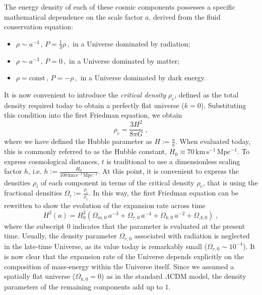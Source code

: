 \documentclass[12pt,a4paper,oneside]{report}
\begin{document}
The energy density of each of these cosmic components possesses a specific mathematical dependence on the scale factor $a$, derived from the fluid conservation equation:%
\begin{itemize}
  \item $\rho \sim a^{-4} \, , \, P = \frac{1}{3}\rho \, ,$ in a Universe dominated by radiation;
  \item $\rho \sim a^{-3} \, , \, P = 0 \, ,$ in a Universe dominated by matter;
  \item $\rho = \mathrm{const} \, , \, P = -\rho \, ,$ in a Universe dominated by dark energy.
\end{itemize}
It is now convenient to introduce the \textit{critical density} $\rho_\mathrm{c}$, defined as the total density required today to obtain a perfectly flat universe ($k = 0$). Substituting this condition into the first Friedman equation, we obtain
\begin{equation}
  \rho_\mathrm{c} = \frac{3H^2}{8 \pi G} \; ,
  \label{eq:rho_crit}
\end{equation}
where we have defined the Hubble parameter as $H := \frac{\dot{a}}{a}$. When evaluated today, this is commonly referred to as the Hubble constant, $H_0 \approx 70 \, \mathrm{km \, s^{-1} \, Mpc^{-1}}$. To express cosmological distances, $t$ is traditional to use a dimensionless scaling factor $h$, i.e. $h := \frac{H_0}{100 \, \mathrm{km \, s^{-1} \, Mpc^{-1}}}$. At this point, it is convenient to express the densities $\rho_i$ of each component in terms of the critical density $\rho_\mathrm{c}$, that is using the fractional densities $\Omega_i := \frac{\rho_i}{\rho_\mathrm{c}}$. In this way, the first Friedman equation can be rewritten to show the evolution of the expansion rate across time
\begin{equation}
  H^2(a) = H_0^2 \left( \Omega_{m,0} \, a^{-3} + \Omega_{r,0} \, a^{-4} + \Omega_{k,0} \, a^{-2} + \Omega_{\Lambda,0} \right) \; ,
  \label{eq:Ha}
\end{equation}
where the subscript $0$ indicates that the parameter is evaluated at the present time. Usually, the density parameter $\Omega_{r,0}$ associated with radiation is neglected in the late-time Universe, as its value today is remarkably small ($\Omega_{r,0} \sim 10^{-4}$). It is now clear that the expansion rate of the Universe depends explicitly on the composition of mass-energy within the Universe itself. Since we assumed a spatially flat universe ($\Omega_{k,0} = 0$) as in the standard $\Lambda \mathrm{CDM}$ model, the density parameters of the remaining components add up to $1$.
\end{document}
